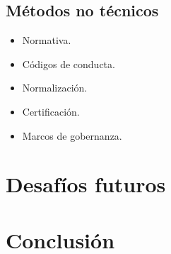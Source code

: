\subsection{Métodos no técnicos}
\begin{itemize}
    \item Normativa.
    \item Códigos de conducta.
    \item Normalización.
    \item Certificación.
    \item Marcos de gobernanza.
\end{itemize}

\section{Desafíos futuros}


\section{Conclusión}





